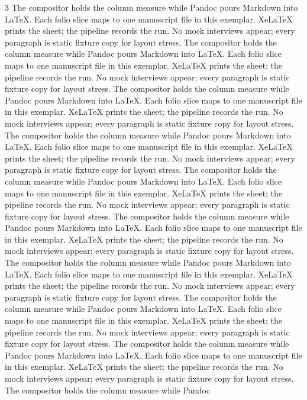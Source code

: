 \documentclass[
]{article}
\begin{document}
\begin{multicols}{3}
The compositor holds the column measure while Pandoc pours Markdown into
LaTeX. Each folio slice maps to one manuscript file in this exemplar.
XeLaTeX prints the sheet; the pipeline records the run. No mock
interviews appear; every paragraph is static fixture copy for layout
stress. The compositor holds the column measure while Pandoc pours
Markdown into LaTeX. Each folio slice maps to one manuscript file in
this exemplar. XeLaTeX prints the sheet; the pipeline records the run.
No mock interviews appear; every paragraph is static fixture copy for
layout stress. The compositor holds the column measure while Pandoc
pours Markdown into LaTeX. Each folio slice maps to one manuscript file
in this exemplar. XeLaTeX prints the sheet; the pipeline records the
run. No mock interviews appear; every paragraph is static fixture copy
for layout stress. The compositor holds the column measure while Pandoc
pours Markdown into LaTeX. Each folio slice maps to one manuscript file
in this exemplar. XeLaTeX prints the sheet; the pipeline records the
run. No mock interviews appear; every paragraph is static fixture copy
for layout stress. The compositor holds the column measure while Pandoc
pours Markdown into LaTeX. Each folio slice maps to one manuscript file
in this exemplar. XeLaTeX prints the sheet; the pipeline records the
run. No mock interviews appear; every paragraph is static fixture copy
for layout stress. The compositor holds the column measure while Pandoc
pours Markdown into LaTeX. Each folio slice maps to one manuscript file
in this exemplar. XeLaTeX prints the sheet; the pipeline records the
run. No mock interviews appear; every paragraph is static fixture copy
for layout stress. The compositor holds the column measure while Pandoc
pours Markdown into LaTeX. Each folio slice maps to one manuscript file
in this exemplar. XeLaTeX prints the sheet; the pipeline records the
run. No mock interviews appear; every paragraph is static fixture copy
for layout stress. The compositor holds the column measure while Pandoc
pours Markdown into LaTeX. Each folio slice maps to one manuscript file
in this exemplar. XeLaTeX prints the sheet; the pipeline records the
run. No mock interviews appear; every paragraph is static fixture copy
for layout stress. The compositor holds the column measure while Pandoc
pours Markdown into LaTeX. Each folio slice maps to one manuscript file
in this exemplar. XeLaTeX prints the sheet; the pipeline records the
run. No mock interviews appear; every paragraph is static fixture copy
for layout stress. The compositor holds the column measure while Pandoc

\end{multicols}
\end{document}
